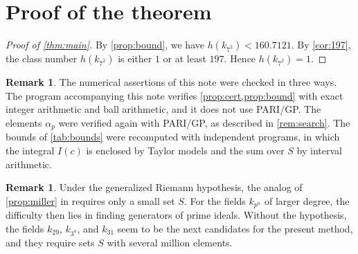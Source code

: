 \documentclass[11pt]{amsart}
\theoremstyle{plain}
\theoremstyle{definition}
\newtheorem{remark}[theorem]{Remark}
\begin{document}
\section{Proof of the theorem} \label{sec:proof}

\begin{proof}[Proof of \cref{thm:main}]
By \cref{prop:bound}, we have $h(k_{7^2}) < 160.7121$.
By \cref{cor:197}, the class number $h(k_{7^2})$ is either $1$ or at least $197$.
Hence $h(k_{7^2}) = 1$.
\end{proof}

\begin{remark} \label{rem:audit}
The numerical assertions of this note were checked in three ways.
The program accompanying this note verifies \cref{prop:cert,prop:bound} with exact integer arithmetic and ball arithmetic, and it does not use PARI/GP.
The elements $\alpha_p$ were verified again with PARI/GP, as described in \cref{rem:search}.
The bounds of \cref{tab:bounds} were recomputed with independent programs, in which the integral $I(c)$ is enclosed by Taylor models and the sum over $S$ by interval arithmetic.
\end{remark}

\begin{remark} \label{rem:next}
Under the generalized Riemann hypothesis, the analog of \cref{prop:miller} in \cite{Mi15b} requires only a small set $S$.
For the fields $k_{p^n}$ of larger degree, the difficulty then lies in finding generators of prime ideals.
Without the hypothesis, the fields $k_{29}$, $k_{3^4}$, and $k_{31}$ seem to be the next candidates for the present method, and they require sets $S$ with several million elements.
\end{remark}
\end{document}
